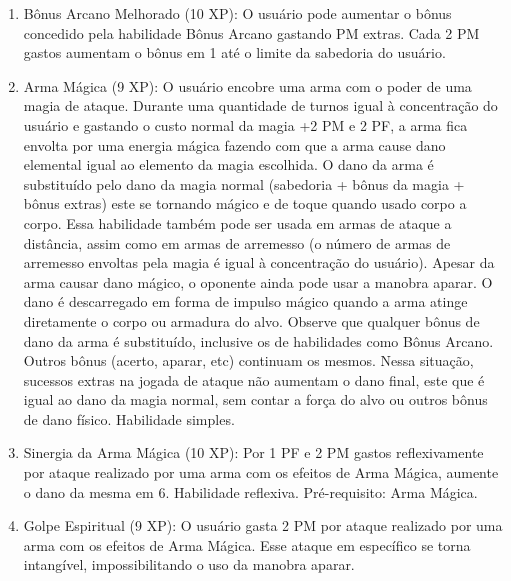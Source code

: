 \begin{enumerate}
  \item Bônus Arcano Melhorado (10 XP): O usuário pode aumentar o bônus concedido pela habilidade Bônus Arcano gastando PM extras. Cada 2 PM gastos aumentam o bônus em 1 até o limite da sabedoria do usuário. 
  
    
  \item Arma Mágica (9 XP): O usuário encobre uma arma com o poder de uma magia de ataque. Durante uma quantidade de turnos igual à concentração do usuário e gastando o custo normal da magia +2 PM e 2 PF, a arma fica envolta por uma energia mágica fazendo com que a arma cause dano elemental igual ao elemento da magia escolhida. O dano da arma é substituído pelo dano da magia normal (sabedoria + bônus da magia + bônus extras) este se tornando mágico e de toque quando usado corpo a corpo. Essa habilidade também pode ser usada em armas de ataque a distância, assim como em armas de arremesso (o número de armas de arremesso envoltas pela magia é igual à concentração do usuário). Apesar da arma causar dano mágico, o oponente ainda pode usar a manobra aparar. O dano é descarregado em forma de impulso mágico quando a arma atinge diretamente o corpo ou armadura do alvo. Observe que qualquer bônus de dano da arma é substituído, inclusive os de habilidades como Bônus Arcano. Outros bônus (acerto, aparar, etc) continuam os mesmos. Nessa situação, sucessos extras na jogada de ataque não aumentam o dano final, este que é igual ao dano da magia normal, sem contar a força do alvo ou outros bônus de dano físico. Habilidade simples. 
  
  \item Sinergia da Arma Mágica (10 XP): Por 1 PF e 2 PM gastos reflexivamente por ataque realizado por uma arma com os efeitos de Arma Mágica, aumente o dano da mesma em 6. Habilidade reflexiva. Pré-requisito: Arma Mágica. 
  
  \item Golpe Espiritual (9 XP): O usuário gasta 2 PM por ataque realizado por uma arma com os efeitos de Arma Mágica. Esse ataque em específico se torna intangível, impossibilitando o uso da manobra aparar.    
    	

\end{enumerate}
